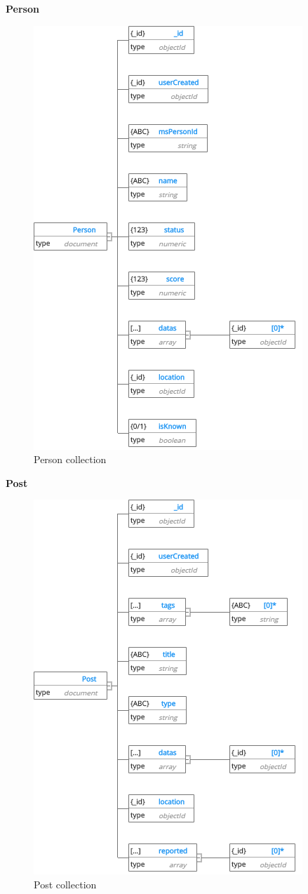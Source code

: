 \cleardoublepage
\textbf{Person}
\begin{center}
	\begin{figure}[H]
		\centering
		\includegraphics[width=0.7\columnwidth]{images/chap4/Person.png}
		\caption{Person collection}
	\end{figure}
\end{center}
\cleardoublepage
\textbf{Post}
\begin{center}
	\begin{figure}[H]
		\centering
		\includegraphics[width=0.7\columnwidth]{images/chap4/Post.png}
		\caption{Post collection}
	\end{figure}
\end{center}
